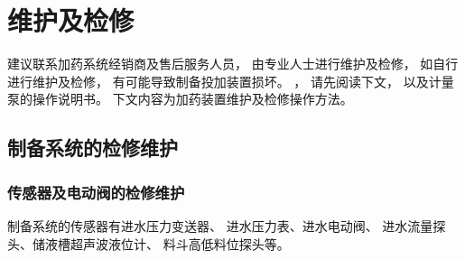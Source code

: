 \documentclass[UTF8,a4paper,12pt,titlepage]{ctexart}
\begin{document}
\section{维护及检修}
   建议联系加药系统经销商及售后服务人员，
   由专业人士进行维护及检修，
   如自行进行维护及检修，
   有可能导致制备投加装置损坏。
   ，
   请先阅读下文，
   以及计量泵的操作说明书。
   下文内容为加药装置维护及检修操作方法。

   \subsection{制备系统的检修维护}
        \subsubsection{传感器及电动阀的检修维护} 
            制备系统的传感器有进水压力变送器、
            进水压力表、进水电动阀、
            进水流量探头、储液槽超声波液位计、
            料斗高低料位探头等。

            \newpage
\end{document}
